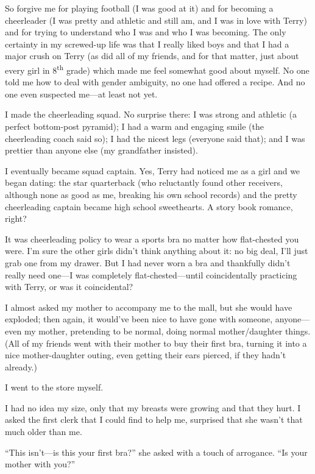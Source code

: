 So forgive me for playing football (I was good at it) and for becoming a
cheerleader (I was pretty and athletic and still am, and I was in love
with Terry) and for trying to understand who I was and who I was
becoming. The only certainty in my screwed-up life was that I really
liked boys and that I had a major crush on Terry (as did all of my
friends, and for that matter, just about every girl in
8\textsuperscript{th} grade) which made me feel somewhat good about
myself. No one told me how to deal with gender ambiguity, no one had
offered a recipe. And no one even suspected me---at least not yet.

I made the cheerleading squad. No surprise there: I was strong and
athletic (a perfect bottom-post pyramid); I had a warm and engaging
smile (the cheerleading coach said so); I had the nicest legs (everyone
said that); and I was prettier than anyone else (my grandfather
insisted).

I eventually became squad captain. Yes, Terry had noticed me as a girl
and we began dating: the star quarterback (who reluctantly found other
receivers, although none as good as me, breaking his own school records)
and the pretty cheerleading captain became high school sweethearts. A
story book romance, right?

It was cheerleading policy to wear a sports bra no matter how
flat-chested you were. I'm sure the other girls didn't think anything
about it: no big deal, I'll just grab one from my drawer. But I had
never worn a bra and thankfully didn't really need one---I was
completely flat-chested---until coincidentally practicing with Terry, or
was it coincidental?

I almost asked my mother to accompany me to the mall, but she would have
exploded; then again, it would've been nice to have gone with someone,
anyone---even my mother, pretending to be normal, doing normal
mother/daughter things. (All of my friends went with their mother to buy
their first bra, turning it into a nice mother-daughter outing, even
getting their ears pierced, if they hadn't already.)

I went to the store myself.

I had no idea my size, only that my breasts were growing and that they
hurt. I asked the first clerk that I could find to help me, surprised
that she wasn't that much older than me.

``This isn't---is this your first bra?'' she asked with a touch of
arrogance. ``Is your mother with you?''

